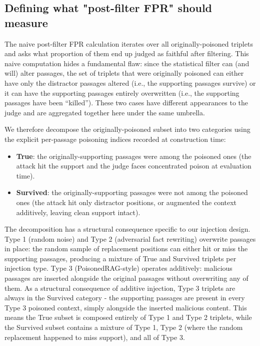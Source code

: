 \subsection{Defining what "post-filter FPR" should measure}

The naive post-filter FPR calculation iterates over all originally-poisoned triplets and asks what proportion of them end up judged as faithful after filtering. This naive computation hides a fundamental flaw: since the statistical filter can (and will) alter passages, the set of triplets that were originally poisoned can either have only the distractor passages altered (i.e., the supporting passages survive) or it can have the supporting passages entirely overwritten (i.e., the supporting passages have been ``killed''). These two cases have different appearances to the judge and are aggregated together here under the same umbrella.

We therefore decompose the originally-poisoned subset into two categories using the explicit per-passage poisoning indices recorded at construction time:

\begin{itemize}
  \item \textbf{True}: the originally-supporting passages were among the poisoned ones (the attack hit the support and the judge faces concentrated poison at evaluation time).
  \item \textbf{Survived}: the originally-supporting passages were not among the poisoned ones (the attack hit only distractor positions, or augmented the context additively, leaving clean support intact).
\end{itemize}

The decomposition has a structural consequence specific to our injection design. Type 1 (random noise) and Type 2 (adversarial fact rewriting) overwrite passages in place: the random sample of replacement positions can either hit or miss the supporting passages, producing a mixture of True and Survived triplets per injection type. Type 3 (PoisonedRAG-style) operates additively: malicious passages are inserted alongside the original passages without overwriting any of them. As a structural consequence of additive injection, Type 3 triplets are always in the Survived category - the supporting passages are present in every Type 3 poisoned context, simply alongside the inserted malicious content. This means the True subset is composed entirely of Type 1 and Type 2 triplets, while the Survived subset contains a mixture of Type 1, Type 2 (where the random replacement happened to miss support), and all of Type 3.


